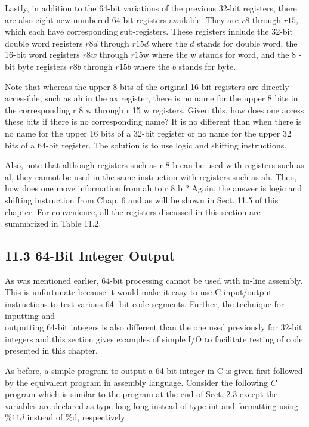 \documentclass[10pt]{book}
\begin{document}
Lastly, in addition to the 64-bit variations of the previous 32-bit registers, there are also eight new numbered 64-bit registers available. They are $r 8$ through $r 15$, which each have corresponding sub-registers. These registers include the 32-bit double word registers $r 8 d$ through $r 15 d$ where the $d$ stands for double word, the 16-bit word registers $r 8 w$ through $r 15 \mathrm{w}$ where the w stands for word, and the 8 -bit byte registers $r 8 b$ through $r 15 b$ where the $b$ stands for byte.

Note that whereas the upper 8 bits of the original 16-bit registers are directly accessible, such as ah in the ax register, there is no name for the upper 8 bits in the corresponding r 8 w through r 15 w registers. Given this, how does one access these bits if there is no corresponding name? It is no different than when there is no name for the upper 16 bits of a 32-bit register or no name for the upper 32 bits of a 64-bit register. The solution is to use logic and shifting instructions.

Also, note that although registers such as r 8 b can be used with registers such as al, they cannot be used in the same instruction with registers such as ah. Then, how does one move information from ah to r 8 b ? Again, the answer is logic and shifting instruction from Chap. 6 and as will be shown in Sect. 11.5 of this chapter. For convenience, all the registers discussed in this section are summarized in Table 11.2.

\subsection*{11.3 64-Bit Integer Output}
As was mentioned earlier, 64-bit processing cannot be used with in-line assembly. This is unfortunate because it would make it easy to use C input/output instructions to test various 64 -bit code segments. Further, the technique for inputting and\\
outputting 64-bit integers is also different than the one used previously for 32-bit integers and this section gives examples of simple I/O to facilitate testing of code presented in this chapter.

As before, a simple program to output a 64-bit integer in C is given first followed by the equivalent program in assembly language. Consider the following $C$ program which is similar to the program at the end of Sect. 2.3 except the variables are declared as type long long instead of type int and formatting using $\% 11 d$ instead of \%d, respectively:
\end{document}
